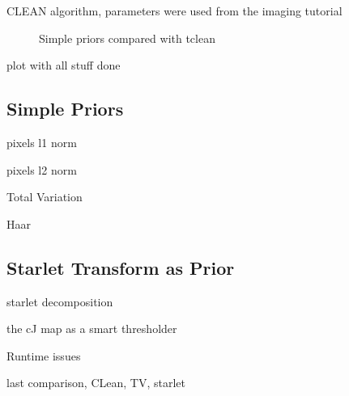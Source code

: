 CLEAN algorithm, parameters were used from the imaging tutorial \cite{casaImagingGuide}
\begin{figure}
	\caption{Simple priors compared with tclean}
\end{figure}

\begin{figure}
\end{figure}
plot with all stuff done

\subsection{Simple Priors}

pixels l1 norm

pixels l2 norm

Total Variation

Haar 

\subsection{Starlet Transform as Prior}

starlet decomposition

the cJ map as a smart thresholder

Runtime issues


last comparison, CLean, TV, starlet